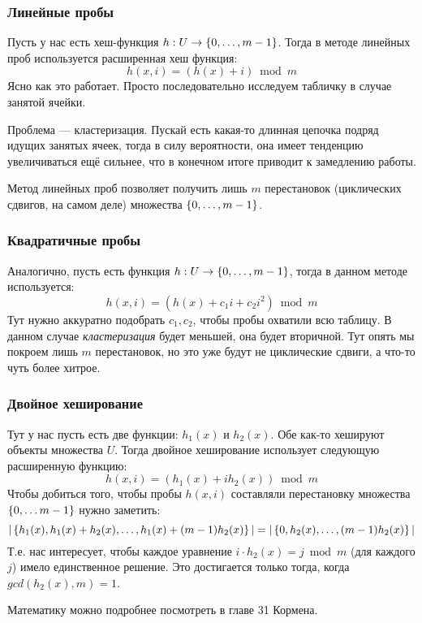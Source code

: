 \subsubsection{Линейные пробы}
Пусть у нас есть хеш-функция $h: U \to \left\lbrace 0, \ldots, m-1 \right\rbrace$. Тогда в методе линейных проб используется расширенная хеш функция:
\[
    h(x, i) = (h(x) + i) \bmod m
\]
Ясно как это работает. Просто последовательно исследуем табличку в случае занятой ячейки.
\begin{note}
Проблема --- кластеризация. Пускай есть какая-то длинная цепочка подряд идущих занятых ячеек, тогда в силу вероятности, она имеет тенденцию увеличиваться ещё сильнее, что в конечном итоге приводит к замедлению работы.
\end{note}
Метод линейных проб позволяет получить лишь $m$ перестановок (циклических сдвигов, на самом деле) множества $\left\lbrace 0, \ldots, m-1 \right\rbrace$.
\subsubsection{Квадратичные пробы}
Аналогично, пусть есть функция $h: U \to \left\lbrace 0, \ldots, m-1 \right\rbrace$, тогда в данном методе используется:
\[
    h(x, i) = (h(x) + c_1i + c_2i^2) \bmod m
\]
Тут нужно аккуратно подобрать $c_1, c_2$, чтобы пробы охватили всю таблицу. В данном случае \emph{кластеризация} будет меньшей, она будет вторичной.
Тут опять мы покроем лишь $m$ перестановок, но это уже будут не циклические сдвиги, а что-то чуть более хитрое.
\subsubsection{Двойное хеширование}
Тут у нас пусть есть две функции: $h_1(x)$ и $h_2(x)$. Обе как-то хешируют объекты множества $U$.
Тогда двойное хеширование использует следующую расширенную функцию:
\[
    h(x, i) = (h_1(x) + ih_2(x)) \bmod m
\]
Чтобы добиться того, чтобы пробы $h(x, i)$ составляли перестановку множества $\left\lbrace 0, \ldots m-1 \right\rbrace$ нужно заметить:
\[
    |\left\lbrace h_1(x), h_1(x) + h_2(x), \ldots, h_1(x) + (m-1)h_2(x) \right\rbrace| = |\left\lbrace 0, h_2(x), \ldots, (m-1)h_2(x) \right\rbrace|
\]
Т.е. нас интересует, чтобы каждое уравнение $i \cdot h_2(x) = j \bmod m$ (для каждого $j$) имело единственное решение. Это достигается только тогда, когда $gcd(h_2(x), m) = 1$. 
\begin{note}
Математику можно подробнее посмотреть в главе 31 Кормена.
\end{note}

